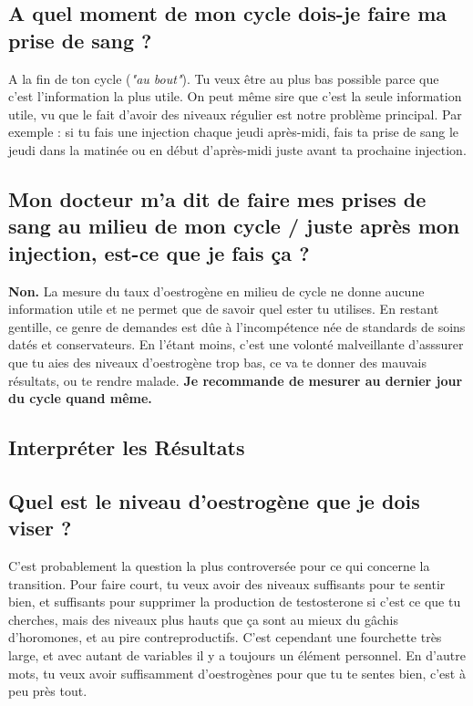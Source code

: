 \documentclass{article}
\begin{document}
\subsection{A quel moment de mon cycle dois-je faire ma prise de sang ?}

A la fin de ton cycle (\textit{"au bout"}). Tu veux être au plus bas possible parce que c'est l'information la plus utile. On peut même sire que c'est la seule information utile, vu que le fait d'avoir des niveaux régulier est notre problème principal. Par exemple : si tu fais une injection chaque jeudi après-midi, fais ta prise de sang le jeudi dans la matinée ou en début d'après-midi juste avant ta prochaine injection.

\subsection{Mon docteur m'a dit de faire mes prises de sang au milieu de mon cycle / juste après mon injection, est-ce que je fais ça ?}

\textbf{Non.} La mesure du taux d'oestrogène en milieu de cycle ne donne aucune information utile et ne permet que de savoir quel ester tu utilises. En restant gentille, ce genre de demandes est dûe à l'incompétence née de standards de soins datés et conservateurs. En l'étant moins, c'est une volonté malveillante d'asssurer que tu aies des niveaux d'oestrogène trop bas, ce va te donner des mauvais résultats, ou te rendre malade. \textbf{Je recommande de mesurer au dernier jour du cycle quand même.} 

\subsection*{Interpréter les Résultats}

\subsection{Quel est le niveau d'oestrogène que je dois viser ?}

C'est probablement la question la plus controversée pour ce qui concerne la transition. Pour faire court, tu veux avoir des niveaux suffisants pour te sentir bien, et suffisants pour supprimer la production de testosterone si c'est ce que tu cherches, mais des niveaux plus hauts que ça sont au mieux du gâchis d'horomones, et au pire contreproductifs. C'est cependant une fourchette très large, et avec autant de variables il y a toujours un élément personnel. En d'autre mots, tu veux avoir suffisamment d'oestrogènes pour que tu te sentes bien, c'est à peu près tout.
\end{document}
